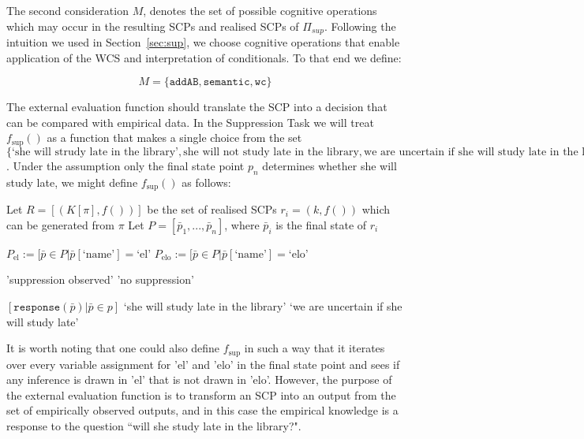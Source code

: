 The second consideration $M$, denotes the set of possible cognitive operations which may occur in the resulting SCPs and realised SCPs of $\Pi_{sup}$. Following the intuition we used in Section~\ref{sec:sup}, we choose cognitive operations that enable application of the WCS and interpretation of conditionals. To that end we define:

\[
M=\{\texttt{addAB}, \texttt{semantic}, \texttt{wc}\}
\]

The external evaluation function should translate the SCP into a decision that can be compared with empirical data. In the Suppression Task we will treat $f_\text{sup}()$ as a function that makes a single choice from the set $\{\text{`she will strudy late in the library'},\text{she will not study late in the library}, \text{we are uncertain if she will study late in the library}\}$. Under the assumption only the final state point $p_n$
determines whether she will study late, we might define $f_\text{sup}()$ as follows:

\begin{algorithm}[H] \label{evaluation:f_sup}
\SetAlgoLined
{}
{
Let $R=[(K[\pi],f())]$ be the set of realised SCPs $r_i=(k,f())$ which can be generated from $\pi$\;
Let $P=[\bar{p}_1,...,\bar{p}_n]$, where $\bar{p}_i$ is the final state of $r_i$\;

$P_\text{el}:=[\bar{p} \in P | \bar{p}[\text{`name'}]=\text{`el'}$\;
$P_\text{elo}:=[\bar{p} \in P | \bar{p}[\text{`name'}]=\text{`elo'}$\;

{
\Return 'suppression observed'
}
\Else
{
\Return 'no suppression'
}
}
{
\Return $[\texttt{response}(\bar{p}) | \bar{p} \in p]$
}
{
{
\Return `she will study late in the library'
}
{
}
\Else
{
\Return `we are uncertain if she will study late'
}
}

\caption{$\texttt{f}_\text{sup}$}
\end{algorithm}

It is worth noting that one could also define $f_\text{sup}$ in such a way that it iterates over every variable assignment for 'el' and 'elo' in the final state point and sees if any inference is drawn in 'el' that is not drawn in 'elo'. However, the purpose of the external evaluation function is to transform an SCP into an output from the set of empirically observed outputs, and in this case the empirical knowledge is a response to the question ``will she study late in the library?".

